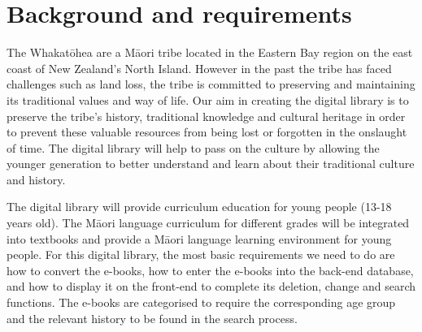 \chapter{Background and requirements}

The Whakatōhea are a Māori tribe located in the Eastern Bay region on the east coast of New Zealand's North Island. However in the past the tribe has faced challenges such as land loss, the tribe is committed to preserving and maintaining its traditional values and way of life. Our aim in creating the digital library is to preserve the tribe's history, traditional knowledge and cultural heritage in order to prevent these valuable resources from being lost or forgotten in the onslaught of time. The digital library will help to pass on the culture by allowing the younger generation to better understand and learn about their traditional culture and history.

The digital library will provide curriculum education for young people (13-18 years old). The Māori language curriculum for different grades will be integrated into textbooks and provide a Māori language learning environment for young people. For this digital library, the most basic requirements we need to do are how to convert the e-books, how to enter the e-books into the back-end database, and how to display it on the front-end to complete its deletion, change and search functions. The e-books are categorised to require the corresponding age group and the relevant history to be found in the search process.

